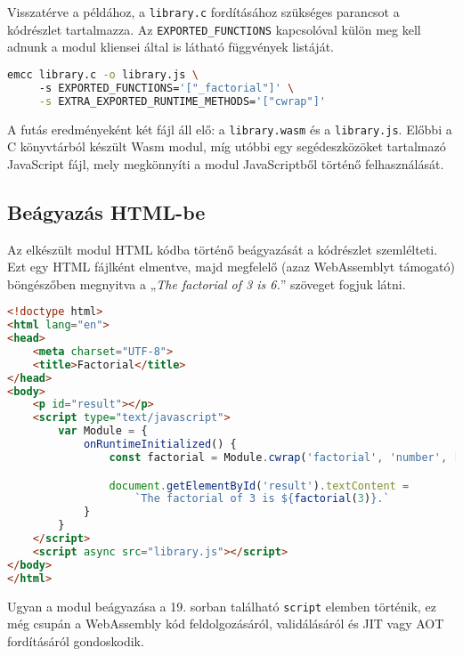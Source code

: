 Visszatérve a példához, a \texttt{library.c} fordításához szükséges parancsot a  kódrészlet tartalmazza. Az \texttt{EXPORTED\_FUNCTIONS} kapcsolóval külön meg kell adnunk a modul kliensei által is látható függvények listáját.

\begin{lstlisting}[language=bash, caption={A \texttt{library.c} fordítása Emscriptennel.}, captionpos=b, label=Listing::WebAssembly::CompileWithEmscripten, numbers=none]
emcc library.c -o library.js \ 
     -s EXPORTED_FUNCTIONS='["_factorial"]' \
     -s EXTRA_EXPORTED_RUNTIME_METHODS='["cwrap"]'
\end{lstlisting}

A futás eredményeként két fájl áll elő: a \texttt{library.wasm} és a \texttt{library.js}. Előbbi a C könyvtárból készült Wasm modul, míg utóbbi egy segédeszközöket tartalmazó JavaScript fájl, mely megkönnyíti a modul JavaScriptből történő felhasználását.

\subsection{Beágyazás HTML-be}

Az elkészült modul HTML kódba történő beágyazását a  kódrészlet szemlélteti. Ezt egy HTML fájlként elmentve, majd megfelelő (azaz WebAssemblyt támogató) böngészőben megnyitva a „\textit{The factorial of 3 is 6.}” szöveget fogjuk látni.

\begin{lstlisting}[language=HTML, caption={A beágyazó HTML kód.}, captionpos=b, label=Listing::WebAssembly::EmbeddingHTML]
<!doctype html>
<html lang="en">
<head>
    <meta charset="UTF-8">
    <title>Factorial</title>
</head>
<body>
    <p id="result"></p>
    <script type="text/javascript">
        var Module = {
            onRuntimeInitialized() {
                const factorial = Module.cwrap('factorial', 'number', ['number'])

                document.getElementById('result').textContent =
                    `The factorial of 3 is ${factorial(3)}.`
            }
        }
    </script>
    <script async src="library.js"></script>
</body>
</html>
\end{lstlisting}

Ugyan a modul beágyazása a 19. sorban található \texttt{script} elemben történik, ez még csupán a WebAssembly kód feldolgozásáról, validálásáról és JIT vagy AOT fordításáról gondoskodik.

